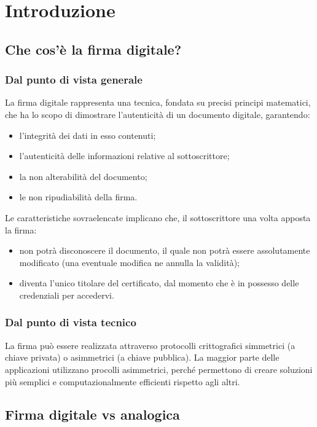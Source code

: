 \chapter{Introduzione}

\section{Che cos'è la firma digitale?}

\subsection{Dal punto di vista generale}

La firma digitale rappresenta una tecnica, fondata su precisi principi matematici, che ha lo scopo di dimostrare l'autenticità di un documento digitale, garantendo:
\begin{itemize}
	\item l'integrità dei dati in esso contenuti;
	\item l'autenticità delle informazioni relative al sottoscrittore;
	\item la non alterabilità del documento;
	\item le non ripudiabilità della firma.
\end{itemize}
Le caratteristiche sovraelencate implicano che, il sottoscrittore una volta apposta la firma:
\begin{itemize}
	\item non potrà disconoscere il documento, il quale non potrà essere assolutamente modificato (una eventuale modifica ne annulla la validità);
	\item diventa l'unico titolare del certificato, dal momento che è in possesso delle credenziali per accedervi.
\end{itemize}

\subsection{Dal punto di vista tecnico}

La firma può essere realizzata attraverso protocolli crittografici simmetrici (a chiave privata) o asimmetrici (a chiave pubblica). La maggior parte delle applicazioni utilizzano procolli asimmetrici, perché permettono di creare soluzioni più semplici e computazionalmente efficienti rispetto agli altri.

\newpage

\section{Firma digitale vs analogica}

